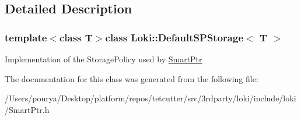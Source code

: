 \subsection{Detailed Description}
\subsubsection*{template$<$class T$>$class Loki\+::\+Default\+S\+P\+Storage$<$ T $>$}

Implementation of the Storage\+Policy used by \hyperlink{classLoki_1_1SmartPtr}{Smart\+Ptr} 

The documentation for this class was generated from the following file\+:\begin{DoxyCompactItemize}
\item 
/\+Users/pourya/\+Desktop/platform/repos/tetcutter/src/3rdparty/loki/include/loki/Smart\+Ptr.\+h\end{DoxyCompactItemize}
